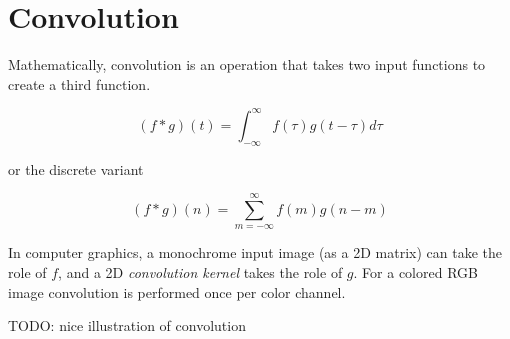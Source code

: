 \section{Convolution}
Mathematically, convolution is an operation that takes two input functions to create a third function.

\[
    (f * g)(t) = \int^{\infty}_{-\infty}{f(\tau)g(t-\tau) d\tau}
\]

or the discrete variant

\[
    (f * g)(n) = \sum^{\infty}_{m=-\infty}{f(m)g(n-m)}
\]

In computer graphics,
a monochrome input image (as a 2D matrix) can take the role of $f$, and a 2D \textit{convolution kernel} takes the role of $g$.
For a colored RGB image convolution is performed once per color channel.

TODO: nice illustration of convolution

